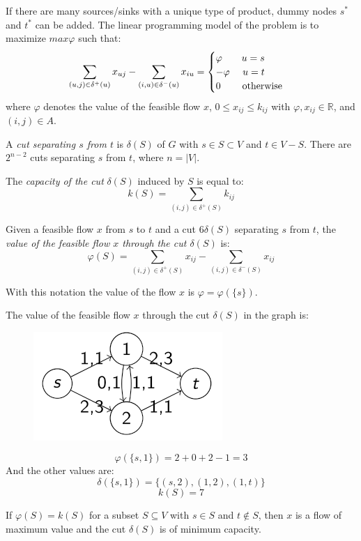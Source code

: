 \documentclass[12pt, a4paper]{report}
\newtheorem[style=M,bodystyle=\normalfont]{proposition}{Proposition}
\newtheorem[style=M,bodystyle=\normalfont]{theorem}{Theorem}
\newtheorem[style=M,bodystyle=\normalfont]{corollary}{Corollary}
\newtheorem[style=M,bodystyle=\normalfont]{lemma}{Lemma}
\newtheorem[style=M,bodystyle=\normalfont]{definition}{Definition}
\begin{document}
    If there are many sources/sinks with a unique type of product, dummy nodes $s^{*}$ and $t^{*}$ can be added. The linear programming model of the problem is to maximize 
    $max \varphi$ such that: 
    \[\sum_{(u,j)\in \delta^{+}(u)}x_{uj}-\sum_{(i,u)\in \delta^{-}(u)}x_{iu}=
    \begin{cases}
        \varphi \:\:\:\:\:\:\:\:\: u=s    \\
        -\varphi \:\:\:\:\:\: u=t   \\
        0 \:\:\:\:\:\:\:\:\:\: \textnormal{otherwise}
    \end{cases}\]
    where $\varphi$ denotes the value of the feasible flow $x$, $0 \leq x_{ij} \leq k_{ij}$ with $\varphi,x_{ij} \in \mathbb{R}$, and $(i,j) \in A$.
    \begin{definition}
        A \emph{cut separating $s$ from $t$} is $\delta(S)$ of $G$ with $s \in S \subset V$ and $t \in V-S$. There are $2^{n-2}$ cuts separating $s$ from $t$, where 
        $n=\left\lvert V \right\rvert $.

        The \emph{capacity of the cut} $\delta(S)$ induced by $S$ is equal to: 
        \[k(S)=\sum_{(i,j)\in \delta^{+}(S)}k_{ij}\]

        Given a feasible flow $x$ from $s$ to $t$ and a cut $6\delta(S)$ separating $s$ from $t$, the \emph{value of the feasible flow $x$ through the cut $\delta(S)$} is: 
        \[\varphi(S)=\sum_{(i,j)\in \delta^{+}(S)}x_{ij} - \sum_{(i,j)\in \delta^{-}(S)}x_{ij}\]
    \end{definition}
    With this notation the value of the flow $x$ is $\varphi = \varphi(\{s\})$. 
    \begin{example}
        The value of the feasible flow $x$ through the cut $\delta(S)$ in the graph is: 
        \begin{figure}[H]
            \centering
            \includegraphics[width=0.4\linewidth]{images/flow.png}
        \end{figure}
        \[\varphi(\{s,1\})=2+0+2-1=3\]
        And the other values are: 
        \[\delta(\{s,1\})=\{(s, 2),(1,2),(1, t)\}\]
        \[k(S)=7\]
    \end{example}
    If $\varphi(S) = k(S)$ for a subset $S \subseteq V$ with $s \in S$ and $t \notin S$, then $x$ is a flow of maximum value and the cut $\delta(S)$ is of minimum capacity. 
\end{document}
